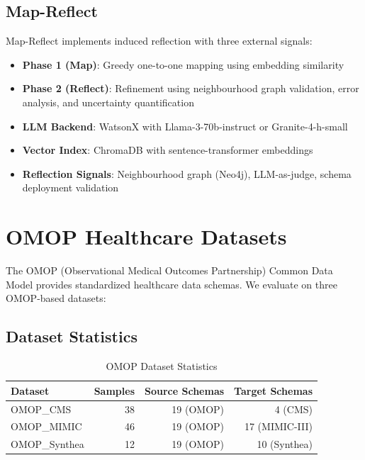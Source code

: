 \documentclass[sigconf, nonacm]{acmart}
\begin{document}
\subsection{Map-Reflect}

Map-Reflect implements induced reflection with three external signals:

\begin{itemize}
    \item \textbf{Phase 1 (Map)}: Greedy one-to-one mapping using embedding similarity
    \item \textbf{Phase 2 (Reflect)}: Refinement using neighbourhood graph validation, error analysis, and uncertainty quantification
    \item \textbf{LLM Backend}: WatsonX with Llama-3-70b-instruct or Granite-4-h-small
    \item \textbf{Vector Index}: ChromaDB with sentence-transformer embeddings
    \item \textbf{Reflection Signals}: Neighbourhood graph (Neo4j), LLM-as-judge, schema deployment validation
\end{itemize}

\section{OMOP Healthcare Datasets}
\label{app:omop}

The OMOP (Observational Medical Outcomes Partnership) Common Data Model provides standardized healthcare data schemas. We evaluate on three OMOP-based datasets:

\subsection{Dataset Statistics}

\begin{table}[htbp]
\centering
\begin{tabular}{lrrr}
\toprule
\textbf{Dataset} & \textbf{Samples} & \textbf{Source Schemas} & \textbf{Target Schemas} \\
\midrule
OMOP\_CMS & 38 & 19 (OMOP) & 4 (CMS) \\
OMOP\_MIMIC & 46 & 19 (OMOP) & 17 (MIMIC-III) \\
OMOP\_Synthea & 12 & 19 (OMOP) & 10 (Synthea) \\
\bottomrule
\end{tabular}
\caption{OMOP Dataset Statistics}
\end{table}
\end{document}
